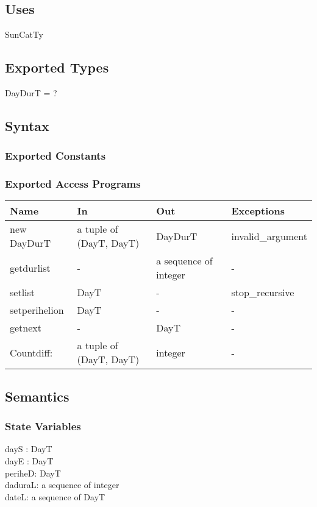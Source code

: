 \documentclass[12pt, titlepage]{article}
\begin{document}
\subsection{Uses}

SunCatTy\\

\subsection{Exported Types}

DayDurT = ?\\

\subsection{Syntax}

\subsubsection{Exported Constants}


\subsubsection{Exported Access Programs}

\begin{center}
\begin{tabular}{p{3cm} p{5cm} p{4cm} p{2cm}}
\hline
\textbf{Name} & \textbf{In} & \textbf{Out} & \textbf{Exceptions} \\
\hline
new DayDurT& a tuple of (DayT, DayT)  & DayDurT & invalid\_argument \\
getdurlist &  -  & a sequence of integer & - \\
setlist  &  DayT  & - & stop\_recursive \\
setperihelion &  DayT  & - & - \\
getnext & - & DayT &  - \\
Countdiff: & a tuple of (DayT, DayT)  & integer & - \\

\hline
\end{tabular}
\end{center}


\subsection{Semantics}

\subsubsection{State Variables}
dayS : DayT\\
dayE : DayT\\
periheD: DayT\\
daduraL: a sequence of integer\\
dateL: a sequence of DayT\\
\end{document}
